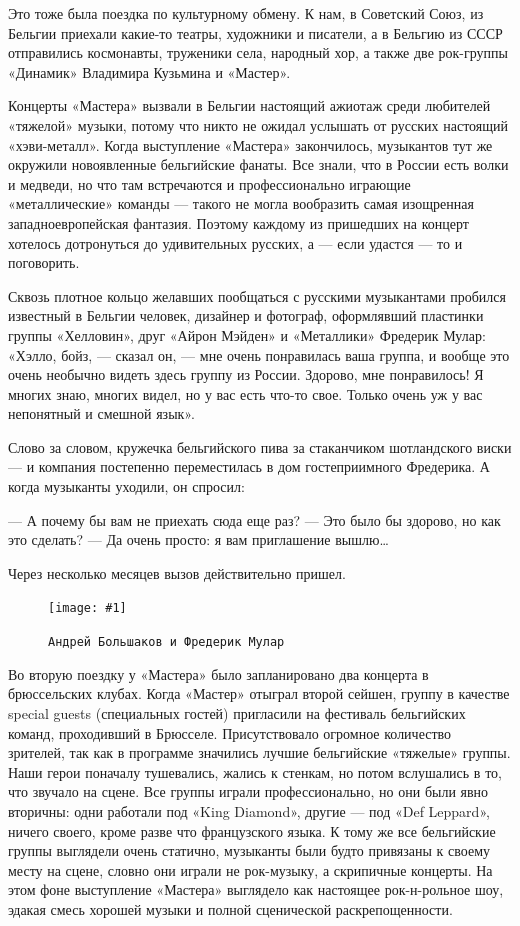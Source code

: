 \documentclass[10pt, twoside]{book}
\newcommand{\myincludegraphics}[1]{\texttt{[image: \#1]}}
\begin{document}
Это тоже была поездка по культурному обмену. К нам, в Советский Союз, из Бельгии приехали какие-то театры, художники и
писатели, а в Бельгию из СССР отправились космонавты, труженики села, народный хор, а также две рок-группы «Динамик»
Владимира Кузьмина и «Мастер».

Концерты «Мастера» вызвали в Бельгии настоящий ажиотаж среди любителей «тяжелой» музыки, потому что никто не ожидал
услышать от русских настоящий «хэви-металл». Когда выступление «Мастера» закончилось, музыкантов тут же окружили
новоявленные бельгийские фанаты. Все знали, что в России есть волки и медведи, но что там встречаются и профессионально
играющие «металлические» команды — такого не могла вообразить самая изощренная западноевропейская фантазия. Поэтому
каждому из пришедших на концерт хотелось дотронуться до удивительных русских, а — если удастся — то и поговорить.

Сквозь плотное кольцо желавших пообщаться с русскими музыкантами пробился известный в Бельгии человек, дизайнер и
фотограф, оформлявший пластинки группы «Хелловин», друг «Айрон Мэйден» и «Металлики» Фредерик Мулар: «Хэлло, бойз, —
сказал он, — мне очень понравилась ваша группа, и вообще это очень необычно видеть здесь группу из России. Здорово, мне
понравилось! Я многих знаю, многих видел, но у вас есть что-то свое. Только очень уж у вас непонятный и смешной язык».

Слово за словом, кружечка бельгийского пива за стаканчиком шотландского виски — и компания постепенно переместилась в
дом гостеприимного Фредерика. А когда музыканты уходили, он спросил:

— А почему бы вам не приехать сюда еще раз?
— Это было бы здорово, но как это сделать?
— Да очень просто: я вам приглашение вышлю\ldots

Через несколько месяцев вызов действительно пришел.

\begin{figure}
    \centering
    \myincludegraphics{Image23}
    \caption{\texttt{Андрей Большаков и Фредерик Мулар}}
\end{figure}

Во вторую поездку у «Мастера» было запланировано два концерта в брюссельских клубах. Когда «Мастер» отыграл второй
сейшен, группу в качестве special guests (специальных гостей) пригласили на фестиваль бельгийских команд, проходивший в
Брюсселе. Присутствовало огромное количество зрителей, так как в программе значились лучшие бельгийские «тяжелые»
группы. Наши герои поначалу тушевались, жались к стенкам, но потом вслушались в то, что звучало на сцене. Все группы
играли профессионально, но они были явно вторичны: одни работали под «King Diamond», другие — под «Def Leppard», ничего
своего, кроме разве что французского языка. К тому же все бельгийские группы выглядели очень статично, музыканты были
будто привязаны к своему месту на сцене, словно они играли не рок-музыку, а скрипичные концерты. На этом фоне
выступление «Мастера» выглядело как настоящее рок-н-рольное шоу, эдакая смесь хорошей музыки и полной сценической
раскрепощенности.
\end{document}
